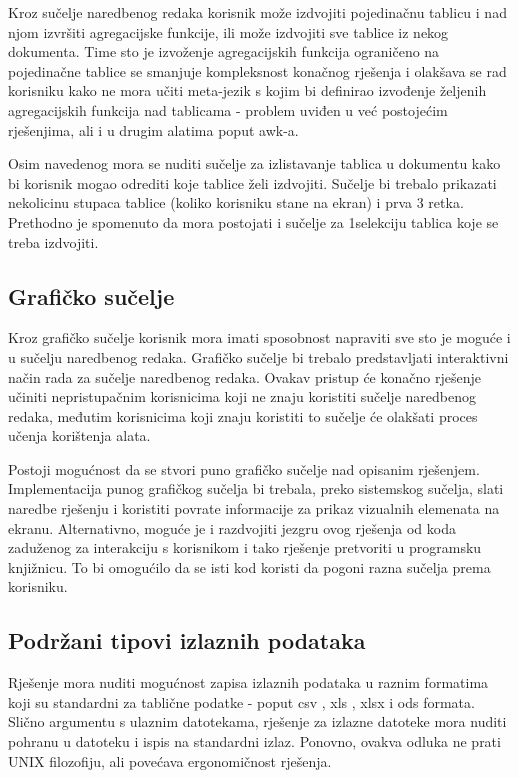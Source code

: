 \documentclass[times, utf8, zavrsni]{fer}
\begin{document}
Kroz sučelje naredbenog redaka korisnik može izdvojiti pojedinačnu tablicu i nad
njom izvršiti agregacijske funkcije, ili može izdvojiti sve tablice iz nekog
dokumenta. Time sto je izvoženje agregacijskih funkcija ograničeno na
pojedinačne tablice se smanjuje kompleksnost konačnog rješenja i olakšava se
rad korisniku kako ne mora učiti meta-jezik s kojim bi definirao izvođenje
željenih agregacijskih funkcija nad tablicama - problem uviđen u već postojećim
rješenjima, ali i u drugim alatima poput awk-a.

Osim navedenog mora se nuditi sučelje za izlistavanje tablica u dokumentu
kako bi korisnik mogao odrediti koje tablice želi izdvojiti. Sučelje bi
trebalo prikazati nekolicinu stupaca tablice (koliko korisniku stane na ekran)
i prva 3 retka.  Prethodno je spomenuto da mora postojati i sučelje za
1selekciju tablica koje se treba izdvojiti.

\subsection{Grafičko sučelje}

Kroz grafičko sučelje korisnik mora imati sposobnost napraviti sve sto je
moguće i u sučelju naredbenog redaka. Grafičko sučelje bi trebalo predstavljati
interaktivni način rada za sučelje naredbenog redaka. Ovakav pristup će konačno
rješenje učiniti nepristupačnim korisnicima koji ne znaju koristiti sučelje
naredbenog redaka, međutim korisnicima koji znaju koristiti to sučelje će
olakšati proces učenja korištenja alata.

Postoji mogućnost da se stvori puno grafičko sučelje nad opisanim rješenjem.
Implementacija punog grafičkog sučelja bi trebala, preko sistemskog sučelja,
slati naredbe rješenju i koristiti povrate informacije za prikaz vizualnih
elemenata na ekranu. Alternativno, moguće je i razdvojiti jezgru ovog rješenja
od koda zaduženog za interakciju s korisnikom i tako rješenje pretvoriti u
programsku knjižnicu. To bi omogućilo da se isti kod koristi da pogoni razna
sučelja prema korisniku.

\subsection{Podržani tipovi izlaznih podataka}

Rješenje mora nuditi mogućnost zapisa izlaznih podataka u raznim formatima
koji su standardni za tablične podatke - poput csv \cite{csv_documentation},
xls \cite{xls_documentation}, xlsx \cite{xlsx_documentation} i
ods \cite{ods_documentation} formata.
Slično argumentu s ulaznim datotekama, rješenje za izlazne datoteke mora nuditi
pohranu u datoteku i ispis na standardni izlaz. Ponovno, ovakva odluka ne
prati UNIX filozofiju, ali povećava ergonomičnost rješenja.
\end{document}
